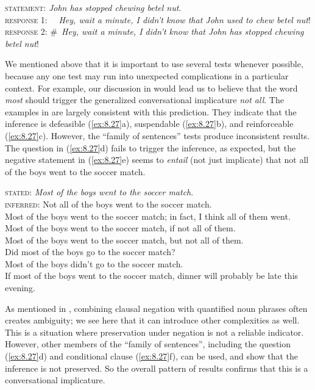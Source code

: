 \ea \label{ex:8.26}
\textsc{statement}: \textit{John has stopped chewing betel nut}.\\
\ea \textsc{response 1}: ~~\textit{Hey, wait a minute, I didn’t know that John used to chew betel nut}!\\
\ex \textsc{response 2}: \#~\textit{Hey, wait a minute, I didn’t know that John has stopped chewing betel nut}!
   \z
   \z

We mentioned above that it is important to use several tests whenever possible, because any one test may run into unexpected complications in a particular context. For example, our discussion in  would lead us to believe that the word \textit{most} should trigger the generalized conversational implicature \textit{not all}. The examples in  are largely consistent with this prediction. They indicate that the inference is defeasible (\ref{ex:8.27}a), suspendable (\ref{ex:8.27}b), and reinforceable (\ref{ex:8.27}c). However, the “family of sentences” tests produce inconsistent results. The question in (\ref{ex:8.27}d) fails to trigger the inference, as expected, but the negative statement in (\ref{ex:8.27}e) seems to \textit{entail} (not just implicate) that not all of the boys went to the soccer match.

\ea \label{ex:8.27}
\textsc{stated}: \textit{Most of the boys went to the soccer match}.\\
\textsc{inferred}: Not all of the boys went to the soccer match.\\
\ea Most of the boys went to the soccer match; in fact, I think all of them went.\\
\ex Most of the boys went to the soccer match, if not all of them.\\
\ex Most of the boys went to the soccer match, but not all of them.\\
\ex Did most of the boys go to the soccer match?\\
\ex Most of the boys didn’t go to the soccer match.\\
\ex If most of the boys went to the soccer match, dinner will probably be late this evening.
                       \z
\z

As mentioned in , combining clausal negation with quantified noun phrases often creates ambiguity; we see here that it can introduce other complexities as well. This is a situation where preservation under negation is not a reliable indicator. However, other members of the “family of sentences”, including the question (\ref{ex:8.27}d) and conditional clause (\ref{ex:8.27}f), can be used, and show that the inference is not preserved. So the overall pattern of results confirms that this is a conversational implicature.



